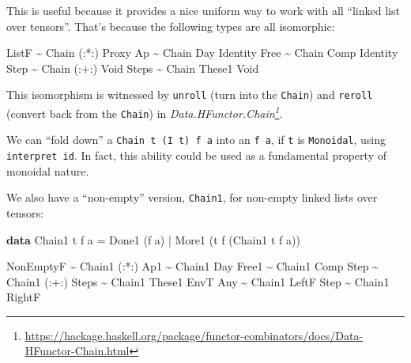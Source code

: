 \documentclass[]{article}
\newenvironment{Shaded}{}{}
\newcommand{\DataTypeTok}[1]{\textcolor[rgb]{0.56,0.13,0.00}{#1}}
\newcommand{\KeywordTok}[1]{\textcolor[rgb]{0.00,0.44,0.13}{\textbf{#1}}}
\newcommand{\NormalTok}[1]{#1}
\newcommand{\OperatorTok}[1]{\textcolor[rgb]{0.40,0.40,0.40}{#1}}
\newcommand{\OtherTok}[1]{\textcolor[rgb]{0.00,0.44,0.13}{#1}}
\renewcommand{\href}[2]{#2\footnote{\url{#1}}}
\begin{document}
\begin{itemize}
  This is useful because it provides a nice uniform way to work with all
  ``linked list over tensors''. That's because the following types are all
  isomorphic:

\begin{Shaded}
\begin{Highlighting}[]
\DataTypeTok{ListF} \OperatorTok{\textasciitilde{}} \DataTypeTok{Chain}\NormalTok{ (}\OperatorTok{:*:}\NormalTok{)  }\DataTypeTok{Proxy}
\DataTypeTok{Ap}    \OperatorTok{\textasciitilde{}} \DataTypeTok{Chain} \DataTypeTok{Day}    \DataTypeTok{Identity}
\DataTypeTok{Free}  \OperatorTok{\textasciitilde{}} \DataTypeTok{Chain} \DataTypeTok{Comp}   \DataTypeTok{Identity}
\DataTypeTok{Step}  \OperatorTok{\textasciitilde{}} \DataTypeTok{Chain}\NormalTok{ (}\OperatorTok{:+:}\NormalTok{)  }\DataTypeTok{Void}
\DataTypeTok{Steps} \OperatorTok{\textasciitilde{}} \DataTypeTok{Chain} \DataTypeTok{These1} \DataTypeTok{Void}
\end{Highlighting}
\end{Shaded}

  This isomorphism is witnessed by \texttt{unroll} (turn into the
  \texttt{Chain}) and \texttt{reroll} (convert back from the \texttt{Chain}) in
  \emph{\href{https://hackage.haskell.org/package/functor-combinators/docs/Data-HFunctor-Chain.html}{Data.HFunctor.Chain}}.

  We can ``fold down'' a \texttt{Chain\ t\ (I\ t)\ f\ a} into an \texttt{f\ a},
  if \texttt{t} is \texttt{Monoidal}, using \texttt{interpret\ id}. In fact,
  this ability could be used as a fundamental property of monoidal nature.

  We also have a ``non-empty'' version, \texttt{Chain1}, for non-empty linked
  lists over tensors:

\begin{Shaded}
\begin{Highlighting}[]
\KeywordTok{data} \DataTypeTok{Chain1}\NormalTok{ t f a }\OtherTok{=} \DataTypeTok{Done1}\NormalTok{ (f a)}
                  \OperatorTok{|} \DataTypeTok{More1}\NormalTok{ (t f (}\DataTypeTok{Chain1}\NormalTok{ t f a))}
\end{Highlighting}
\end{Shaded}

\begin{Shaded}
\begin{Highlighting}[]
\DataTypeTok{NonEmptyF} \OperatorTok{\textasciitilde{}} \DataTypeTok{Chain1}\NormalTok{ (}\OperatorTok{:*:}\NormalTok{)}
\DataTypeTok{Ap1}       \OperatorTok{\textasciitilde{}} \DataTypeTok{Chain1} \DataTypeTok{Day}
\DataTypeTok{Free1}     \OperatorTok{\textasciitilde{}} \DataTypeTok{Chain1} \DataTypeTok{Comp}
\DataTypeTok{Step}      \OperatorTok{\textasciitilde{}} \DataTypeTok{Chain1}\NormalTok{ (}\OperatorTok{:+:}\NormalTok{)}
\DataTypeTok{Steps}     \OperatorTok{\textasciitilde{}} \DataTypeTok{Chain1} \DataTypeTok{These1}
\DataTypeTok{EnvT} \DataTypeTok{Any}  \OperatorTok{\textasciitilde{}} \DataTypeTok{Chain1} \DataTypeTok{LeftF}
\DataTypeTok{Step}      \OperatorTok{\textasciitilde{}} \DataTypeTok{Chain1} \DataTypeTok{RightF}
\end{Highlighting}
\end{Shaded}


\end{itemize}
\end{document}
